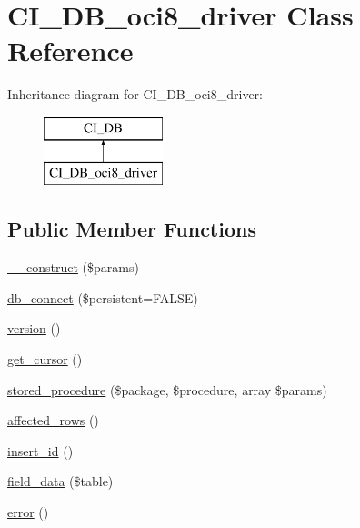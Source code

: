 \hypertarget{class_c_i___d_b__oci8__driver}{}\section{C\+I\+\_\+\+D\+B\+\_\+oci8\+\_\+driver Class Reference}
\label{class_c_i___d_b__oci8__driver}
Inheritance diagram for C\+I\+\_\+\+D\+B\+\_\+oci8\+\_\+driver\+:\begin{figure}[H]
\begin{center}
\leavevmode
\includegraphics[height=2.000000cm]{class_c_i___d_b__oci8__driver}
\end{center}
\end{figure}
\subsection*{Public Member Functions}
\begin{DoxyCompactItemize}
\item 
\mbox{\hyperlink{class_c_i___d_b__oci8__driver_a9162320adff1a1a4afd7f2372f753a3e}{\+\_\+\+\_\+construct}} (\$params)
\item 
\mbox{\hyperlink{class_c_i___d_b__oci8__driver_a52bf595e79e96cc0a7c907a9b45aeb4d}{db\+\_\+connect}} (\$persistent=F\+A\+L\+SE)
\item 
\mbox{\hyperlink{class_c_i___d_b__oci8__driver_a6080dae0886626b9a4cedb29240708b1}{version}} ()
\item 
\mbox{\hyperlink{class_c_i___d_b__oci8__driver_aaf8b241dc9ed2d812e965dc882ed9ea3}{get\+\_\+cursor}} ()
\item 
\mbox{\hyperlink{class_c_i___d_b__oci8__driver_adb2007e6a64069385b285c77480d87b7}{stored\+\_\+procedure}} (\$package, \$procedure, array \$params)
\item 
\mbox{\hyperlink{class_c_i___d_b__oci8__driver_a77248aaad33eb132c04cc4aa3f4bc8cb}{affected\+\_\+rows}} ()
\item 
\mbox{\hyperlink{class_c_i___d_b__oci8__driver_a933f2cde8dc7f87875e257d0a4902e99}{insert\+\_\+id}} ()
\item 
\mbox{\hyperlink{class_c_i___d_b__oci8__driver_a90355121e1ed009e0efdbd544ab56efa}{field\+\_\+data}} (\$table)
\item 
\mbox{\hyperlink{class_c_i___d_b__oci8__driver_a43b8d30b879d4f09ceb059b02af2bc02}{error}} ()
\end{DoxyCompactItemize}
